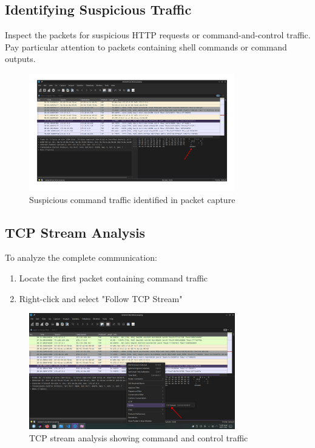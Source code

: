 \documentclass{article}
\begin{document}
\subsection{Identifying Suspicious Traffic}
Inspect the packets for suspicious HTTP requests or command-and-control traffic. Pay particular attention to packets containing shell commands or command outputs.

\begin{figure}[H]
    \centering
    \includegraphics[width=0.8\textwidth]{2}
    \caption{Suspicious command traffic identified in packet capture}
\end{figure}

\subsection{TCP Stream Analysis}
To analyze the complete communication:
\begin{enumerate}
    \item Locate the first packet containing command traffic
    \item Right-click and select "Follow TCP Stream"
\end{enumerate}

\begin{figure}[H]
    \centering
    \includegraphics[width=0.8\textwidth]{3}
    \caption{TCP stream analysis showing command and control traffic}
\end{figure}
\end{document}
